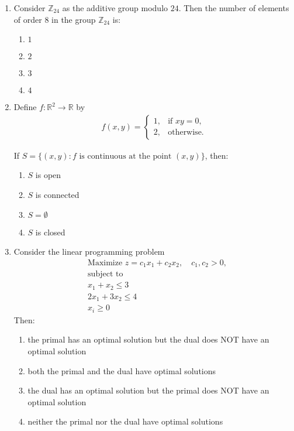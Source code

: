 \documentclass[journal]{IEEEtran}
\numberwithin{equation}{enumi}
\numberwithin{figure}{enumi}
\begin{document}
\begin{enumerate}
\item Consider $\mathbb{Z}_{24}$ as the additive group modulo $24$. Then the number of elements of order $8$ in the group $\mathbb{Z}_{24}$ is:
\hfill{}
\begin{multicols}{4}
\begin{enumerate}
    \item $1$
    \item $2$
    \item $3$
    \item $4$
\end{enumerate}
\end{multicols}

 
\item Define $f : \mathbb{R}^2 \to \mathbb{R}$ by
\begin{align*}
f(x, y) =
\begin{cases}
1, & \text{if } xy = 0, \\
2, & \text{otherwise}.
\end{cases}
\end{align*}

If $S = \{(x, y) : f \text{ is continuous at the point } (x, y)\}$, then:
\hfill{}

\begin{enumerate}
    \item $S$ is open
    \item $S$ is connected
    \item $S = \emptyset$
    \item $S$ is closed
\end{enumerate}
    



\item Consider the linear programming problem
\begin{align*}
& \text{Maximize } z = c_1 x_1 + c_2 x_2, \quad c_1, c_2 > 0, \\
& \text{subject to} \\
& x_1 + x_2 \le 3 \\
& 2x_1 + 3x_2 \le 4 \\
& x_i \ge 0
\end{align*}
Then:
\hfill{}
\begin{enumerate}
\item  the primal has an optimal solution but the dual does NOT have an optimal solution
\item  both the primal and the dual have optimal solutions
\item the dual has an optimal solution but the primal does NOT have an optimal solution
\item neither the primal nor the dual have optimal solutions
\end{enumerate}



\end{enumerate}
\end{document}
